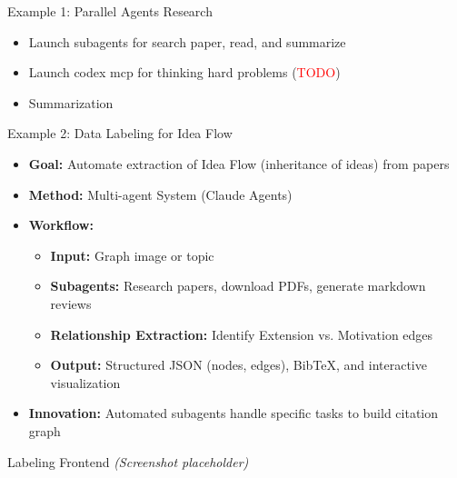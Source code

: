 \documentclass{beamer}
\begin{document}
\begin{frame}{Example 1: Parallel Agents Research}

\begin{itemize}
    \item Launch subagents for search paper, read, and summarize
    \item Launch codex mcp for thinking hard problems (\textcolor{red}{TODO})
    \item Summarization
\end{itemize}

\end{frame}

\begin{frame}{Example 2: Data Labeling for Idea Flow}
\begin{itemize}
    \item \textbf{Goal:} Automate extraction of Idea Flow (inheritance of ideas) from papers
    \item \textbf{Method:} Multi-agent System (Claude Agents)
    \item \textbf{Workflow:}
    \begin{itemize}
        \item \textbf{Input:} Graph image or topic
        \item \textbf{Subagents:} Research papers, download PDFs, generate markdown reviews
        \item \textbf{Relationship Extraction:} Identify Extension vs. Motivation edges
        \item \textbf{Output:} Structured JSON (nodes, edges), BibTeX, and interactive visualization
    \end{itemize}
    \item \textbf{Innovation:} Automated subagents handle specific tasks to build citation graph
\end{itemize}
\end{frame}

\begin{frame}{Labeling Frontend}
\centering
\textit{(Screenshot placeholder)}
\end{frame}
\end{document}
